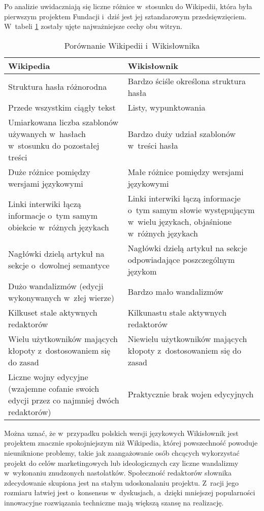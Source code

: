 \documentclass{pracamgr}
\begin{document}
Po analizie uwidaczniają się liczne różnice w~stosunku do Wikipedii, która była pierwszym projektem Fundacji i~dziś jest jej sztandarowym przedsięwzięciem. W~tabeli \ref{tab:wiki-wikt} zostały ujęte najważniejsze cechy obu witryn.
\begin{table}[h]
\begin{center}
	\begin{tabularx}{\textwidth}{ XX }
		\toprule \textbf{Wikipedia} & \textbf{Wikisłownik} \\
		\toprule Struktura hasła różnorodna
			& Bardzo ściśle określona struktura hasła \\
		\midrule Przede wszystkim ciągły tekst
			& Listy, wypunktowania \\
		\midrule Umiarkowana liczba szablonów używanych w~hasłach w~stosunku do pozostałej treści
			& Bardzo duży udział szablonów w~treści hasła \\
		\midrule Duże różnice pomiędzy wersjami językowymi
			& Małe różnice pomiędzy wersjami językowymi \\
		\midrule Linki interwiki łączą informacje o~tym samym obiekcie w~różnych językach
			& Linki interwiki łączą informacje o~tym samym słowie występującym w~wielu językach, objaśnione w~różnych językach \\
		\midrule Nagłówki dzielą artykuł na sekcje o~dowolnej semantyce
			& Nagłówki dzielą artykuł na sekcje odpowiadające poszczególnym językom \\
		\midrule Dużo wandalizmów (edycji wykonywanych w~złej wierze)
			& Bardzo mało wandalizmów \\
		\midrule Kilkuset stale aktywnych redaktorów
			& Kilkunastu stale aktywnych redaktorów \\
		\midrule Wielu użytkowników mających kłopoty z~dostosowaniem się do zasad
			& Niewielu użytkowników mających kłopoty z~dostosowaniem się do zasad \\
		\midrule Liczne wojny edycyjne (wzajemne cofanie swoich edycji przez co najmniej dwóch redaktorów)
			& Praktycznie brak wojen edycyjnych \\
		\bottomrule
	\end{tabularx}
\caption{Porównanie Wikipedii i~Wikisłownika}
\label{tab:wiki-wikt}
\end{center}
\end{table}

Można uznać, że w~przypadku polskich wersji językowych Wikisłownik jest projektem znacznie spokojniejszym niż Wikipedia, której powszechność powoduje nieuniknione problemy, takie jak zaangażowanie osób chcących wykorzystać projekt do celów marketingowych lub ideologicznych czy liczne wandalizmy w~wykonaniu znudzonych nastolatków. Społeczność redaktorów słownika zdecydowanie skupiona jest na stałym udoskonalaniu projektu. Z~racji jego rozmiaru łatwiej jest o~konsensus w~dyskusjach, a~dzięki mniejszej popularności innowacyjne rozwiązania techniczne mają większą szansę na realizację.
\end{document}
